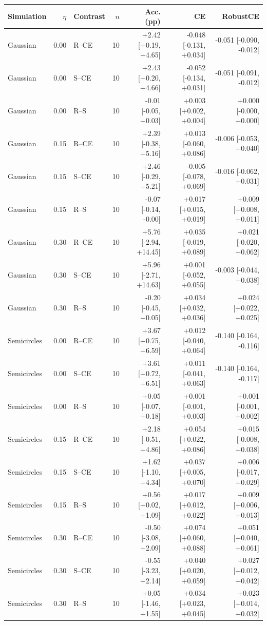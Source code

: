 \begin{tabular}{@{}lrlrrrr@{}}
\toprule
Simulation & $\eta$ & Contrast & $n$ & Acc. (pp) & CE & RobustCE \\
\midrule
Gaussian & 0.00 & R--CE & 10 & +2.42 [+0.19, +4.65] & -0.048 [-0.131, +0.034] & -0.051 [-0.090, -0.012] \\
Gaussian & 0.00 & S--CE & 10 & +2.43 [+0.20, +4.66] & -0.052 [-0.134, +0.031] & -0.051 [-0.091, -0.012] \\
Gaussian & 0.00 & R--S & 10 & -0.01 [-0.05, +0.03] & +0.003 [+0.002, +0.004] & +0.000 [-0.000, +0.000] \\
\addlinespace
Gaussian & 0.15 & R--CE & 10 & +2.39 [-0.38, +5.16] & +0.013 [-0.060, +0.086] & -0.006 [-0.053, +0.040] \\
Gaussian & 0.15 & S--CE & 10 & +2.46 [-0.29, +5.21] & -0.005 [-0.078, +0.069] & -0.016 [-0.062, +0.031] \\
Gaussian & 0.15 & R--S & 10 & -0.07 [-0.14, -0.00] & +0.017 [+0.015, +0.019] & +0.009 [+0.008, +0.011] \\
\addlinespace
Gaussian & 0.30 & R--CE & 10 & +5.76 [-2.94, +14.45] & +0.035 [-0.019, +0.089] & +0.021 [-0.020, +0.062] \\
Gaussian & 0.30 & S--CE & 10 & +5.96 [-2.71, +14.63] & +0.001 [-0.052, +0.055] & -0.003 [-0.044, +0.038] \\
Gaussian & 0.30 & R--S & 10 & -0.20 [-0.45, +0.05] & +0.034 [+0.032, +0.036] & +0.024 [+0.022, +0.025] \\
\addlinespace
Semicircles & 0.00 & R--CE & 10 & +3.67 [+0.75, +6.59] & +0.012 [-0.040, +0.064] & -0.140 [-0.164, -0.116] \\
Semicircles & 0.00 & S--CE & 10 & +3.61 [+0.72, +6.51] & +0.011 [-0.041, +0.063] & -0.140 [-0.164, -0.117] \\
Semicircles & 0.00 & R--S & 10 & +0.05 [-0.07, +0.18] & +0.001 [-0.001, +0.003] & +0.001 [-0.001, +0.002] \\
\addlinespace
Semicircles & 0.15 & R--CE & 10 & +2.18 [-0.51, +4.86] & +0.054 [+0.022, +0.086] & +0.015 [-0.008, +0.038] \\
Semicircles & 0.15 & S--CE & 10 & +1.62 [-1.10, +4.34] & +0.037 [+0.005, +0.070] & +0.006 [-0.017, +0.029] \\
Semicircles & 0.15 & R--S & 10 & +0.56 [+0.02, +1.09] & +0.017 [+0.012, +0.022] & +0.009 [+0.006, +0.013] \\
\addlinespace
Semicircles & 0.30 & R--CE & 10 & -0.50 [-3.08, +2.09] & +0.074 [+0.060, +0.088] & +0.051 [+0.040, +0.061] \\
Semicircles & 0.30 & S--CE & 10 & -0.55 [-3.23, +2.14] & +0.040 [+0.020, +0.059] & +0.027 [+0.012, +0.042] \\
Semicircles & 0.30 & R--S & 10 & +0.05 [-1.46, +1.55] & +0.034 [+0.023, +0.045] & +0.023 [+0.014, +0.032] \\
\bottomrule
\end{tabular}
